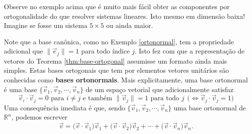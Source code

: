 Observe no exemplo acima que é muito mais fácil obter as componentes por ortogonalidade do que resolver sistemas lineares. Isto mesmo em dimensão baixa! Imagine se fosse um sistema $5\times 5$ ou ainda maior.


Note que a base canônica, como no Exemplo \ref{ortonormal}, tem a propriedade adicional que $\|\vec{e}_j\| = 1$ para todo índice $j$. Isto fez com que a representação de vetores do Teorema \ref{thm:base-ortogonal} assumisse um formato ainda mais simples. Estas bases ortogonais que tem por elementos vetores unitários são conhecidas como \textbf{bases ortonormais}. Mais explicitamente, uma base ortonormal é uma base $\{\vec{v}_1, \vec{v}_2, \cdots, \vec{v}_n\}$ de um espaço vetorial que adicionalmente satisfaz
\begin{equation}
\vec{v}_i \cdot \vec{v}_j = 0 \text{ para } i \neq j \text{ e também } \|\vec{v}_j\| = 1 \text{ para todo } j \ \ \big( \iff \vec{v}_j \cdot \vec{v}_j = 1 \big)
\end{equation} Uma consequência imediata é que, sendo $\{\vec{v}_1, \vec{v}_2, \cdots, \vec{v}_n\}$ uma base ortonormal de $\mathbb{R}^n$, podemos escrever
\begin{equation}
\vec{v} = \big( \vec{v} \cdot \vec{v}_1 \big) \vec{v}_1 + \big( \vec{v} \cdot \vec{v}_2 \big) \vec{v}_2  + \cdots + \big( \vec{v} \cdot \vec{v}_n \big) \vec{v}_n.
\end{equation}

